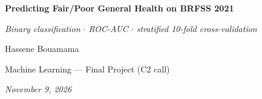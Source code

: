 \documentclass[11pt,a4paper]{article}
\begin{document}
\begin{center}
{\LARGE\bfseries Predicting Fair/Poor General Health on BRFSS 2021}\par\vspace{0.8em}
{\small\itshape Binary classification $\cdot$ ROC-AUC $\cdot$ stratified 10-fold cross-validation}\par\vspace{1.0em}
{\normalsize Hassene Bouamama}\par\vspace{0.3em}
{\small Machine Learning --- Final Project (C2 call)}\par\vspace{0.8em}
{\small\itshape November 9, 2026}\par
\end{center}
\vspace{0.6em}
\end{document}
